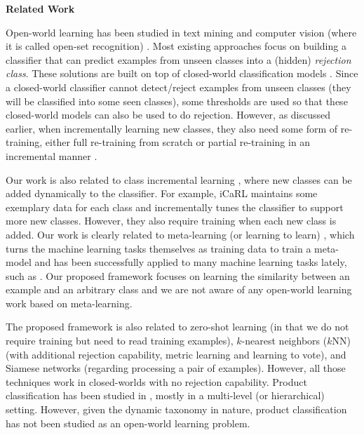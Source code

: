 \textbf{Related Work}
\label{chap2:sec:rel}

Open-world learning has been studied in text mining and computer vision (where it is called open-set recognition) \cite{bendale2015towards,chen2018lifelong,fei2016learning}. Most existing approaches focus on building a classifier that can predict examples from unseen classes into a (hidden) \textit{rejection class}.
These solutions are built on top of closed-world classification models \cite{bendale2015towards,bendale2016towards,shu-xu-liu:2017:EMNLP2017}. Since a closed-world classifier cannot detect/reject examples from unseen classes (they will be classified into some seen classes), some thresholds are used so that these closed-world models can also be used to do rejection. However, as discussed earlier, when incrementally learning new classes, they also need some form of re-training, either full re-training from scratch \cite{bendale2016towards,shu-xu-liu:2017:EMNLP2017} or partial re-training in an incremental manner \cite{bendale2015towards,fei2016learning}. 

Our work is also related to class incremental learning \cite{rebuffi2017icarl,rusu2016progressive,lee2017lifelong}, where new classes can be added dynamically to the classifier. For example, 
iCaRL \cite{rebuffi2017icarl} maintains some exemplary data for each class and incrementally tunes the classifier to support more new classes. However, they also require training when each new class is added. 
Our work is clearly related to meta-learning (or learning to learn) \cite{thrun2012learning}, 
which turns the machine learning tasks themselves as training data to train a meta-model and has been successfully applied to many machine learning tasks lately, such as 
\cite{andrychowicz2016learning,fernando2017pathnet,finn2017model,finn2018probabilistic,fan2018learning}.
Our proposed framework focuses on learning the similarity between an example and an arbitrary class
and we are not aware of any open-world learning work based on meta-learning. 

The proposed framework is also related to zero-shot learning \cite{lampert2009learning,palatucci2009zero,socher2013zero} (in that we do not require training but need to read training examples), 
$k$-nearest neighbors ($k$NN) (with additional rejection capability, metric learning \cite{xing2003distance} and learning to vote), 
and Siamese networks \cite{bromley1994signature,koch2015siamese,vinyals2016matching} (regarding processing a pair of examples). 
However, all those techniques work in closed-worlds with no rejection capability.
Product classification has been studied in \cite{shen2011item,shen2012large,chen2013cost,gupta2016product,cevahir2016large,kozareva2015everyone}, mostly in a multi-level (or hierarchical) setting. 
However, given the dynamic taxonomy in nature, product classification has not been studied as an open-world learning problem.

